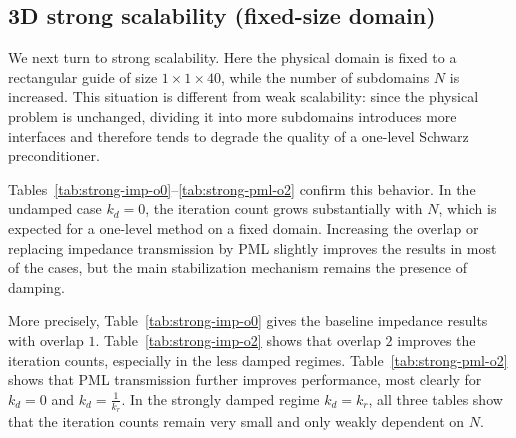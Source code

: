 \documentclass[smallextended]{svjour3}       %
\begin{document}
\subsection{3D strong scalability (fixed-size domain)}
\label{subsec:strong3d}

We next turn to strong scalability. Here the physical domain is fixed to a rectangular guide of
size \(1\times 1\times 40\), while the number of subdomains \(N\) is increased. This situation is
different from weak scalability: since the physical problem is unchanged, dividing it into more
subdomains introduces more interfaces and therefore tends to degrade the quality of a one-level
Schwarz preconditioner.

Tables~\ref{tab:strong-imp-o0}--\ref{tab:strong-pml-o2} confirm this behavior. In the undamped
case \(k_d=0\), the iteration count grows substantially with \(N\), which is expected for a
one-level method on a fixed domain. Increasing the overlap or replacing impedance transmission by
PML slightly improves the results in most of the cases, but the main stabilization mechanism remains the presence of damping.

More precisely, Table~\ref{tab:strong-imp-o0} gives the baseline impedance results with overlap \(1\). Table~\ref{tab:strong-imp-o2} shows that overlap \(2\) improves the
iteration counts, especially in the less damped regimes. Table~\ref{tab:strong-pml-o2} shows that
PML transmission further improves performance, most clearly for \(k_d=0\) and \(k_d=\frac{1}{k_r}\).
In the strongly damped regime \(k_d=k_r\), all three tables show that the iteration counts
remain very small and only weakly dependent on \(N\).
\end{document}
